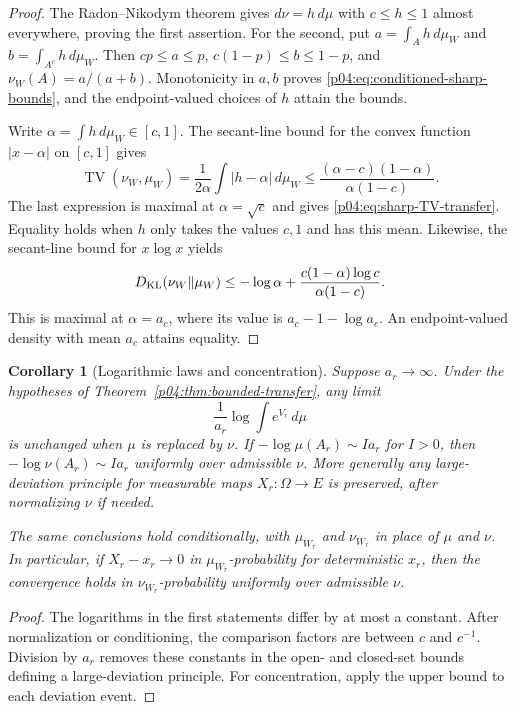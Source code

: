 \documentclass[11pt,letterpaper]{article}
\newtheorem{corollary}[theorem]{Corollary}
\theoremstyle{definition}
\theoremstyle{remark}
\newcommand{\1}{\mathbf 1}
\begin{document}
\begin{proof}
The Radon--Nikodym theorem gives $d\nu=h\,d\mu$ with
$c\le h\le1$ almost everywhere, proving the first assertion.
For the second, put $a=\int_Ah\,d\mu_W$ and
$b=\int_{A^c}h\,d\mu_W$.  Then
$cp\le a\le p$, $c(1-p)\le b\le1-p$, and
$\nu_W(A)=a/(a+b)$.  Monotonicity in $a,b$ proves
\eqref{p04:eq:conditioned-sharp-bounds}, and the endpoint-valued
choices of $h$ attain the bounds.

Write $\alpha=\int h\,d\mu_W\in[c,1]$.  The secant-line
bound for the convex function $|x-\alpha|$ on $[c,1]$ gives
\[
 \operatorname{TV}(\nu_W,\mu_W)
 =\frac1{2\alpha}\int|h-\alpha|\,d\mu_W
 \le\frac{(\alpha-c)(1-\alpha)}{\alpha(1-c)}.
\]
The last expression is maximal at $\alpha=\sqrt c$ and gives
\eqref{p04:eq:sharp-TV-transfer}.  Equality holds when $h$ only takes
the values $c,1$ and has this mean.  Likewise, the secant-line
bound for $x\log x$ yields
\[
 D_{\rm KL}(\nu_W\Vert\mu_W)
 \le -\log\alpha+
       \frac{c(1-\alpha)\log c}{\alpha(1-c)}.
\]
This is maximal at $\alpha=a_c$, where its value is
$a_c-1-\log a_c$.  An endpoint-valued density with mean $a_c$
attains equality.
\end{proof}

\begin{corollary}[Logarithmic laws and concentration]
\label{p04:cor:LD-transfer}
Suppose $a_r\to\infty$.  Under the hypotheses of
Theorem~\ref{p04:thm:bounded-transfer}, any limit
\[
 \frac1{a_r}\log\int e^{V_r}\,d\mu
\]
is unchanged when $\mu$ is replaced by $\nu$.
If $-\log\mu(A_r)\sim I a_r$ for $I>0$, then
$-\log\nu(A_r)\sim I a_r$ uniformly over admissible $\nu$.
More generally any large-deviation principle for measurable maps
$X_r:\Omega\to E$ is preserved, after normalizing $\nu$ if needed.

The same conclusions hold conditionally, with $\mu_{W_r}$ and
$\nu_{W_r}$ in place of $\mu$ and $\nu$.  In particular, if
$X_r-x_r\to0$ in $\mu_{W_r}$-probability for deterministic $x_r$,
then the convergence holds in $\nu_{W_r}$-probability uniformly
over admissible $\nu$.
\end{corollary}
\begin{proof}
The logarithms in the first statements differ by at most a constant.
After normalization or conditioning, the comparison factors are
between $c$ and $c^{-1}$.  Division by $a_r$ removes these constants
in the open- and closed-set bounds defining a large-deviation
principle.  For concentration, apply the upper bound to each
deviation event.
\end{proof}
\end{document}
